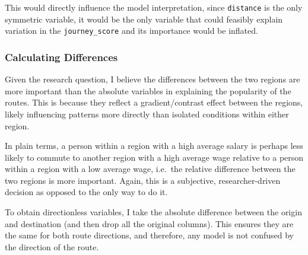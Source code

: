 \documentclass[
  number]{elsarticle}
\begin{document}
This would directly influence the model interpretation, since
\texttt{\textquotesingle{}distance\textquotesingle{}} is the only
symmetric variable, it would be the only variable that could feasibly
explain variation in the
\texttt{\textquotesingle{}journey\_score\textquotesingle{}} and its
importance would be inflated.

\subsubsection{Calculating
Differences}\label{sec-calculating-differences}

Given the research question, I believe the differences between the two
regions are more important than the absolute variables in explaining the
popularity of the routes. This is because they reflect a
gradient/contrast effect between the regions, likely influencing
patterns more directly than isolated conditions within either region.

In plain terms, a person within a region with a high average salary is
perhaps less likely to commute to another region with a high average
wage relative to a person within a region with a low average wage,
i.e.~the relative difference between the two regions is more important.
Again, this is a subjective, researcher-driven decision as opposed to
the only way to do it.

To obtain directionless variables, I take the absolute difference
between the origin and destination (and then drop all the original
columns). This ensures they are the same for both route directions, and
therefore, any model is not confused by the direction of the route.
\end{document}
